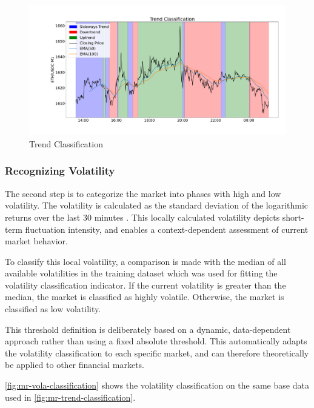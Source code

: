 \begin{figure}[H]
    \centering
    \includegraphics[width=\textwidth]{images/market-regime/market_regime_trend}
    \caption{Trend Classification}
    \label{fig:mr-trend-classification}
\end{figure}

\subsubsection{Recognizing Volatility}
\label{chap:recognizing-vola}

The second step is to categorize the market into phases with high and low volatility.
The volatility is calculated as the standard deviation of the logarithmic returns over the last 30 minutes \cite{wiki-vola}.
This locally calculated volatility depicts short-term fluctuation intensity, and enables a context-dependent assessment of current market behavior.

To classify this local volatility, a comparison is made with the median of all available volatilities in the training dataset which was used for fitting the volatility classification indicator.
If the current volatility is greater than the median, the market is classified as highly volatile.
Otherwise, the market is classified as low volatility.

This threshold definition is deliberately based on a dynamic, data-dependent approach rather than using a fixed absolute threshold.
This automatically adapts the volatility classification to each specific market, and can therefore theoretically be applied to other financial markets.

\autoref{fig:mr-vola-classification} shows the volatility classification on the same base data used in \autoref{fig:mr-trend-classification}.

